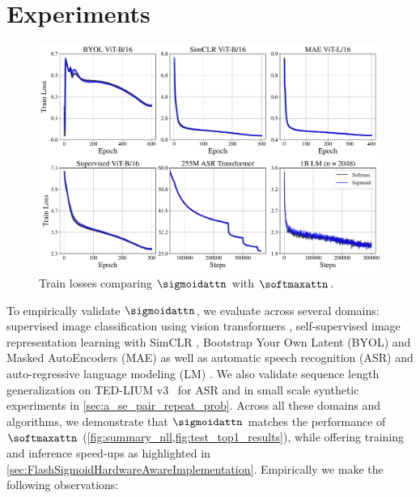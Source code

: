 \section{Experiments}
\label{sec:experiments}
\begin{figure}[h]
\centering
\includegraphics[width=\textwidth]{figures/train_nll_softmax_vs_sigmoid_v4.pdf}
\caption{Train losses comparing $\sigmoidattn$ with $\softmaxattn$.}
\label{fig:summary_nll}
\end{figure}
To empirically validate $\sigmoidattn$, we evaluate across several domains: supervised image classification using vision transformers \citep{DBLP:conf/iclr/DosovitskiyB0WZ21}, self-supervised image representation learning with SimCLR \citep{DBLP:conf/icml/ChenK0H20, DBLP:conf/icml/ZhaiLLBR0GS23}, Bootstrap Your Own Latent (BYOL) \citep{DBLP:conf/nips/GrillSATRBDPGAP20, DBLP:conf/nips/BusbridgeRALDCW23} and Masked AutoEncoders (MAE) \citep{DBLP:conf/cvpr/HeCXLDG22} as well as automatic speech recognition (ASR) \citep{synnaeve2019end,conformer} and auto-regressive language modeling (LM) \citep{DBLP:conf/nips/BrownMRSKDNSSAA20}. We also validate sequence length generalization on TED-LIUM v3~\citep{hernandez2018ted} for ASR and in small scale synthetic experiments in \cref{sec:a_se_pair_repeat_prob}.
Across all these domains and algorithms, we demonstrate that $\sigmoidattn$ matches the performance of $\softmaxattn$ (\cref{fig:summary_nll,fig:test_top1_results}), while offering training and inference speed-ups as highlighted in \cref{sec:FlashSigmoidHardwareAwareImplementation}. Empirically we make the following observations:
